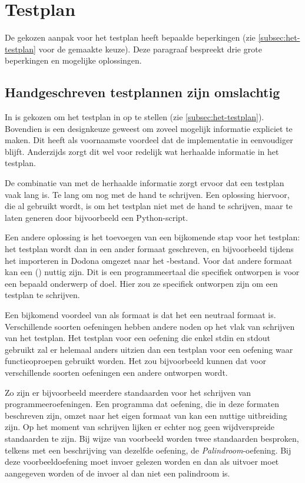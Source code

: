\section{Testplan}\label{sec:beperkingen-testplan}

De gekozen aanpak voor het testplan heeft bepaalde beperkingen (zie \cref{subsec:het-testplan} voor de gemaakte keuze).
Deze paragraaf bespreekt drie grote beperkingen en mogelijke oplossingen.

\subsection{Handgeschreven testplannen zijn omslachtig}\label{subsec:handgeschreven-testplannen-zijn-omslachtig}

In \tested{} is gekozen om het testplan in  op te stellen (zie \cref{subsec:het-testplan}).
Bovendien is een designkeuze geweest om zoveel mogelijk informatie expliciet te maken.
Dit heeft als voornaamste voordeel dat de implementatie in \tested{} eenvoudiger blijft.
Anderzijds zorgt dit wel voor redelijk wat herhaalde informatie in het testplan.

De combinatie van  met de herhaalde informatie zorgt ervoor dat een testplan vaak lang is.
Te lang om nog met de hand te schrijven.
Een oplossing hiervoor, die al gebruikt wordt, is om het testplan niet met de hand te schrijven, maar te laten generen door bijvoorbeeld een Python-script.

Een andere oplossing is het toevoegen van een bijkomende stap voor het testplan: het testplan wordt dan in een ander formaat geschreven, en bijvoorbeeld tijdens het importeren in Dodona omgezet naar het -bestand.
Voor dat andere formaat kan een  () nuttig zijn.
Dit is een programmeertaal die specifiek ontworpen is voor een bepaald onderwerp of doel.
Hier zou ze specifiek ontworpen zijn om een testplan te schrijven.

Een bijkomend voordeel van  als formaat is dat het een neutraal formaat is.
Verschillende soorten oefeningen hebben andere noden op het vlak van schrijven van het testplan.
Het testplan voor een oefening die enkel stdin en stdout gebruikt zal er helemaal anders uitzien dan een testplan voor een oefening waar functieoproepen gebruikt worden.
Het zou bijvoorbeeld kunnen dat voor verschillende soorten oefeningen een andere  ontworpen wordt.

Zo zijn er bijvoorbeeld meerdere standaarden voor het schrijven van programmeeroefeningen.
Een programma dat oefening, die in deze formaten beschreven zijn, omzet naar het eigen formaat van \tested{} kan een nuttige uitbreiding zijn.
Op het moment van schrijven lijken er echter nog geen wijdverspreide standaarden te zijn.
Bij wijze van voorbeeld worden twee standaarden besproken, telkens met een beschrijving van dezelfde oefening, de \emph{Palindroom}-oefening.
Bij deze voorbeeldoefening moet invoer gelezen worden en dan als uitvoer moet aangegeven worden of de invoer al dan niet een palindroom is.

